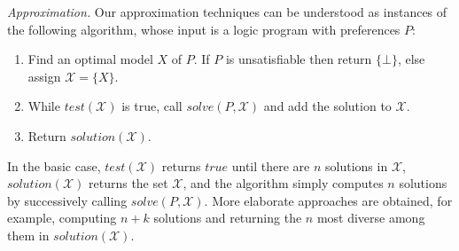 \documentclass[a4paper,USenglish]{oasics-v2016}
\begin{document}
\emph{Approximation.}
%
Our approximation techniques can be understood as instances of the following algorithm,
whose input is a logic program with preferences $P$:
%
\begin{enumerate}%
\item
Find an optimal model $X$ of  $P$. 
If $P$ is unsatisfiable then return $\{\bot\}$, else assign $\mathcal{X}=\{X\}$.
\item
While $\mathit{test}(\mathcal{X})$ is true, call $\mathit{solve}(P,\mathcal{X})$ and add the solution to $\mathcal{X}$.
\item
Return $\mathit{solution}(\mathcal{X})$.
\end{enumerate}
%
In the basic case,
$\mathit{test}(\mathcal{X})$ returns $\mathit{true}$ until there are $n$ solutions in $\mathcal{X}$, 
$\mathit{solution}(\mathcal{X})$ returns the set $\mathcal{X}$,
and the algorithm simply computes $n$ solutions by successively calling $\mathit{solve}(P,\mathcal{X})$.
More elaborate approaches are obtained, for example, computing $n+k$ solutions 
and returning the $n$ most diverse among them in $\mathit{solution(\mathcal{X})}$.
\end{document}
